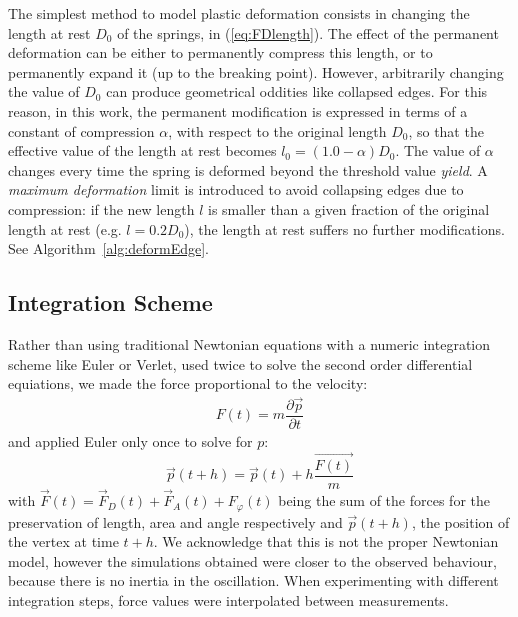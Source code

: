 \documentclass[journal]{IEEEtran}
\newcommand{\eref}[1]{(\ref{#1})}
\newcommand{\alref}[1]{Algorithm~\ref{#1}}
\newcommand{\comment}[1]{{\color{red} #1}}
\begin{document}
The simplest method to model plastic deformation consists in changing the length at rest $D_0$ of the springs, in \eref{eq:FDlength}.  The effect of the permanent deformation can be either to permanently compress this length, or to permanently expand it (up to the breaking point).  However, arbitrarily changing the value of $D_0$ can produce geometrical oddities like collapsed edges.  For this reason, in this work, the permanent modification is expressed in terms of a constant of compression $\alpha$, with respect to the original length $D_0$, so that the effective value of the length at rest becomes $l_0 = (1.0 - \alpha) D_0$.  The value of $\alpha$ changes every time the spring is deformed beyond the threshold value \textit{yield}.  A \textit{maximum deformation} limit is introduced to avoid collapsing edges due to compression: if the new length $l$ is smaller than a given fraction of the original length at rest (e.g. $l=0.2 D_0$), the length at rest suffers no further modifications.  See \alref{alg:deformEdge}.

\subsection{Integration Scheme}
\label{sec:ischeme}
\comment{Rather than using traditional Newtonian equations with a numeric integration scheme like Euler or Verlet, used twice to solve the second order differential equiations,} we made the \comment{force proportional to the velocity:
\begin{align}
 F(t) = m \dfrac{\partial \vec{p}}{\partial t}
\end{align}
and applied Euler only once to solve for $p$:
\begin{equation}
 \vec{p}(t+h) = \vec{p}(t) + h \dfrac{\vec{F(t)}}{m}\label{eq:integration}
\end{equation}}
with $\vec{F}(t) = \vec{F}_D(t) + \vec{F}_A(t) + F_\varphi(t)$ being the sum of the forces for the preservation of length, area and angle respectively and $\vec{p}(t+h)$, the position of the vertex at time $t+h$.  \comment{We acknowledge that this is not the proper Newtonian model, however t}he simulations obtained were closer to the observed behaviour, because there is no inertia in the oscillation.
When experimenting with different integration steps, force values were interpolated between measurements.
\end{document}
